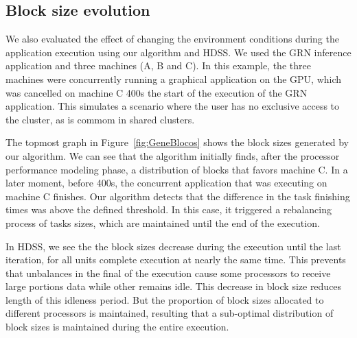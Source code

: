 \documentclass[journal]{IEEEtran}
\begin{document}
\subsection{Block size evolution}

We also evaluated the effect of changing the environment conditions during the application execution using our algorithm and HDSS. We used the GRN inference application and three machines (A, B and C). In this example, the three machines were concurrently running a graphical application on the GPU, which was cancelled on machine C 400s the start of the execution of the GRN application. This simulates a scenario where the user has no exclusive access to the cluster, as is commom in shared clusters.



The topmost graph in Figure~\ref{fig:GeneBlocos} shows the block sizes generated
by our algorithm.  We can see that the algorithm initially finds, after the processor performance modeling phase, a distribution of blocks that favors machine C. In a later moment, before 400s, the concurrent application that was executing on machine C finishes. Our algorithm detects that the difference in the task
finishing times was above the defined threshold. In this case, it triggered a
rebalancing process of tasks sizes, which are maintained until the end of the
execution. 

In HDSS, we see the the block sizes decrease during the execution until the last
iteration, for all units complete execution at nearly the same time. This
prevents that unbalances in the final of the execution cause some processors to
receive large portions data while other remains idle. This decrease in block
size reduces length of this idleness period. But the proportion of block sizes
allocated to different processors is maintained, resulting that a sub-optimal
distribution of block sizes is maintained during the entire execution.

\end{document}
